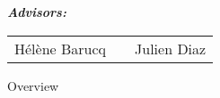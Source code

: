 \documentclass{beamer}
\begin{document}
\begin{frame}[plain]
\maketitle
\small
{\centering\itshape \textbf{Advisors:} \vspace{0.5cm}\par}
\begin{tabular}[t]{l l l}
 Hélène Barucq & &  Julien Diaz
\end{tabular}%
\end{frame}

\begin{frame}{Overview}
\tableofcontents
\end{frame}


 \printbibliography

\end{document}
